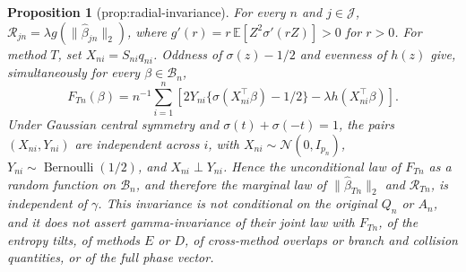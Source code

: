 \documentclass{article}
\newtheorem{proposition}{Proposition}
\begin{document}
\begin{proposition}[prop:radial-invariance]\label{prop:radial-invariance}
For every \(n\) and \(j\in\mathcal J\), \(\mathcal R_{jn}=\lambda g(\|\widehat\beta_{jn}\|_2)\), where \(g'(r)=r\,\mathbb E[Z^2\sigma'(rZ)]>0\) for \(r>0\). For method \(T\), set \(X_{ni}=S_{ni}q_{ni}\). Oddness of \(\sigma(z)-1/2\) and evenness of \(h(z)\) give, simultaneously for every \(\beta\in\mathcal B_n\), \[F_{Tn}(\beta)=n^{-1}\sum_{i=1}^{n}\left[2Y_{ni}\{\sigma(X_{ni}^{\top}\beta)-1/2\}-\lambda h(X_{ni}^{\top}\beta)\right].\] Under Gaussian central symmetry and \(\sigma(t)+\sigma(-t)=1\), the pairs \((X_{ni},Y_{ni})\) are independent across \(i\), with \(X_{ni}\sim\mathcal N(0,I_{p_n})\), \(Y_{ni}\sim\operatorname{Bernoulli}(1/2)\), and \(X_{ni}\perp Y_{ni}\). Hence the unconditional law of \(F_{Tn}\) as a random function on \(\mathcal B_n\), and therefore the marginal law of \(\|\widehat\beta_{Tn}\|_2\) and \(\mathcal R_{Tn}\), is independent of \(\gamma\). This invariance is not conditional on the original \(Q_n\) or \(A_n\), and it does not assert gamma-invariance of their joint law with \(F_{Tn}\), of the entropy tilts, of methods \(E\) or \(D\), of cross-method overlaps or branch and collision quantities, or of the full phase vector.
\end{proposition}
\end{document}
